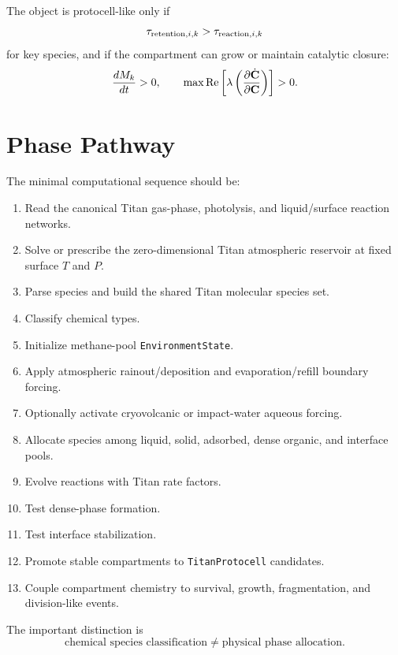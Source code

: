 \documentclass[11pt]{article}
\begin{document}
The object is protocell-like only if
\begin{equation}
\tau_{{\rm retention},i,k}
>
\tau_{{\rm reaction},i,k}
\end{equation}
for key species, and if the compartment can grow or maintain catalytic closure:
\begin{equation}
\frac{dM_k}{dt}>0,
\qquad
\max {\rm Re}\left[\lambda\left(\frac{\partial \dot{\mathbf{C}}}{\partial \mathbf{C}}\right)\right]>0.
\end{equation}

\section{Phase Pathway}

The minimal computational sequence should be:
\begin{enumerate}
\item Read the canonical Titan gas-phase, photolysis, and liquid/surface reaction networks.
\item Solve or prescribe the zero-dimensional Titan atmospheric reservoir at fixed surface $T$ and $P$.
\item Parse species and build the shared Titan molecular species set.
\item Classify chemical types.
\item Initialize methane-pool \texttt{EnvironmentState}.
\item Apply atmospheric rainout/deposition and evaporation/refill boundary forcing.
\item Optionally activate cryovolcanic or impact-water aqueous forcing.
\item Allocate species among liquid, solid, adsorbed, dense organic, and interface pools.
\item Evolve reactions with Titan rate factors.
\item Test dense-phase formation.
\item Test interface stabilization.
\item Promote stable compartments to \texttt{TitanProtocell} candidates.
\item Couple compartment chemistry to survival, growth, fragmentation, and division-like events.
\end{enumerate}

The important distinction is
\begin{equation}
\text{chemical species classification}
\neq
\text{physical phase allocation}.
\end{equation}
\end{document}
